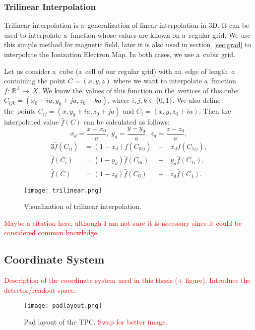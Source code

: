 			\subsubsection{Trilinear Interpolation}
				Trilinear interpolation is a~generalization of linear interpolation in 3D. It can be used to interpolate a~function whose values are known on a~regular grid. We use this simple method for magnetic field, later it is also used in section~\ref{sec:grad} to interpolate the Ionization Electron Map. In both cases, we use a~cubic grid.
				
				Let us consider a~cube (a~cell of our regular grid) with an~edge of length~$a$ containing the point $C = (x,y,z)$ where we want to interpolate a~function $f\!\!:~\!\!\mathbb{R}^3\,\to\,X$. We know the~values of this function on the~vertices of this cube $C_{ijk} = (x_0+ia,y_0+ja,z_0+ka)$, where $i,j,k \in \{0,1\}$. We also define the~points $C_{ij} = (x,y_0+ia,z_0+ja)$ and $C_i=(x,y,z_0+ia)$. Then the interpolated value $\widehat{f}(C)$ can be calculated as follows:
				\begin{equation}
					x_d = \frac{x-x_0}{a},~y_d = \frac{y-y_0}{a},~z_d = \frac{z-z_0}{a},
				\end{equation}
				\begin{alignat}{3}
					\widehat{f}(C_{ij}) &= (1-x_d)f(C_{0ij}) \,&+&\,x_d f(C_{1ij}),\\
					\widehat{f}(C_{i}) &= (1-y_d)\widehat{f}(C_{0i}) &+&\,y_d \widehat{f}(C_{1i}),\\
					\widehat{f}(C) &= (1-z_d)\widehat{f}(C_0) &+&\,z_d \widehat{f}(C_1).
				\end{alignat}
				
				\begin{figure}
					\centering
					\texttt{[image: trilinear.png]}
					\label{fig:trilin}
					\caption{Visualization of trilinear interpolation.}
				\end{figure}
				
				\textcolor{red}{Maybe a citation here, although I am not sure it is necessary since it could be considered common knowledge.}
		
		\subsection{Coordinate System}
		\label{sec:coor}
		\textcolor{red}{Description of the coordinate system used in this thesis (+ figure). Introduce the detector/readout space.}
	
	\begin{figure}
		\centering
		\texttt{[image: padlayout.png]}
		\caption{Pad layout of the TPC. \textcolor{red}{Swap for better image.}}
		\label{fig:padlayout}
	\end{figure}